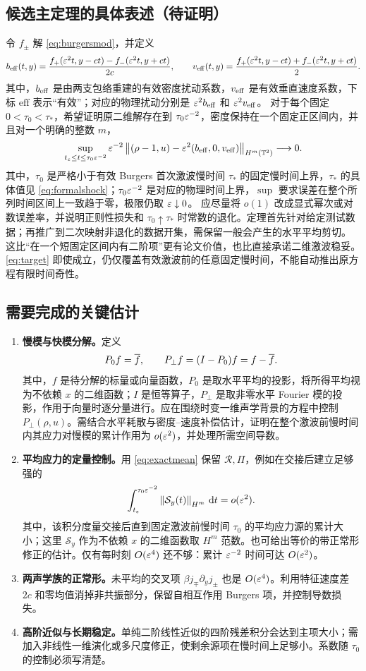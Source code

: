 \subsection{候选主定理的具体表述（待证明）}
令 $f_\pm$ 解 \eqref{eq:burgersmod}，并定义
\[
 b_{\rm eff}(t,y)=\frac{f_+(\varepsilon^2t,y-ct)-f_-(\varepsilon^2t,y+ct)}{2c},\qquad
 v_{\rm eff}(t,y)=\frac{f_+(\varepsilon^2t,y-ct)+f_-(\varepsilon^2t,y+ct)}2.
\]
其中，$b_{\rm eff}$ 是由两支包络重建的有效密度扰动系数，$v_{\rm eff}$ 是有效垂直速度系数，下标 $\mathrm{eff}$ 表示“有效”；对应的物理扰动分别是 $\varepsilon^2b_{\rm eff}$ 和 $\varepsilon^2v_{\rm eff}$。
对于每个固定 $0<\tau_0<\tau_*$，希望证明原二维解存在到 $\tau_0\varepsilon^{-2}$，密度保持在一个固定正区间内，并且对一个明确的整数 $m$，
\begin{equation}\label{eq:target}
 \sup_{t_\varepsilon\le t\le\tau_0\varepsilon^{-2}}
 \varepsilon^{-2}\left\|(\rho-1,u)-\varepsilon^2(b_{\rm eff},0,v_{\rm eff})\right\|_{H^m(\mathbb T^2)}
 \longrightarrow0.
\end{equation}
其中，$\tau_0$ 是严格小于有效 Burgers 首次激波慢时间 $\tau_*$ 的固定慢时间上界，$\tau_*$ 的具体值见 \eqref{eq:formalshock}；$\tau_0\varepsilon^{-2}$ 是对应的物理时间上界，$\sup$ 要求误差在整个所列时间区间上一致趋于零，极限仍取 $\varepsilon\downarrow0$。
应尽量将 $o(1)$ 改成显式幂次或对数误差率，并说明正则性损失和 $\tau_0\uparrow\tau_*$ 时常数的退化。定理首先针对给定测试数据；再推广到二次映射非退化的数据开集，需保留一般会产生的水平平均剪切。
这比“在一个短固定区间内有二阶项”更有论文价值，也比直接承诺二维激波稳妥。\eqref{eq:target} 即使成立，仍仅覆盖有效激波前的任意固定慢时间，不能自动推出原方程有限时间奇性。

\subsection{需要完成的关键估计}
\begin{enumerate}
\item \textbf{慢模与快模分解。}定义
\[
 P_0f=\overline{f},\qquad P_\perp f=(I-P_0)f=f-\overline{f}.
\]
其中，$f$ 是待分解的标量或向量函数，$P_0$ 是取水平平均的投影，将所得平均视为不依赖 $x$ 的二维函数；$I$ 是恒等算子，$P_\perp$ 是取非零水平 Fourier 模的投影，作用于向量时逐分量进行。应在围绕时变一维声学背景的方程中控制 $P_\perp(\rho,u)$。需结合水平耗散与密度--速度补偿估计，证明在整个激波前慢时间内其应力对慢模的累计作用为 $o(\varepsilon^2)$，并处理所需空间导数。
\item \textbf{平均应力的定量控制。}用 \eqref{eq:exactmean} 保留 $\mathcal R,\Pi$，例如在交接后建立足够强的
\[
 \int_{t_\varepsilon}^{\tau_0\varepsilon^{-2}}\left\|\mathcal S_y(t)\right\|_{H^m}\,\mathrm d t=o(\varepsilon^2).
\]
其中，该积分度量交接后直到固定激波前慢时间 $\tau_0$ 的平均应力源的累计大小；这里 $\mathcal S_y$ 作为不依赖 $x$ 的二维函数取 $H^m$ 范数。也可给出等价的带正常形修正的估计。仅有每时刻 $O(\varepsilon^4)$ 还不够：累计 $\varepsilon^{-2}$ 时间可达 $O(\varepsilon^2)$。
\item \textbf{两声学族的正常形。}未平均的交叉项 $\beta j_\mp\partial_yj_\pm$ 也是 $O(\varepsilon^4)$。利用特征速度差 $2c$ 和零均值消掉非共振部分，保留自相互作用 Burgers 项，并控制导数损失。
\item \textbf{高阶近似与长期稳定。}单纯二阶线性近似的四阶残差积分会达到主项大小；需加入非线性一维演化或多尺度修正，使剩余源项在慢时间上足够小。系数随 $\tau_0$ 的控制必须写清楚。
\end{enumerate}

